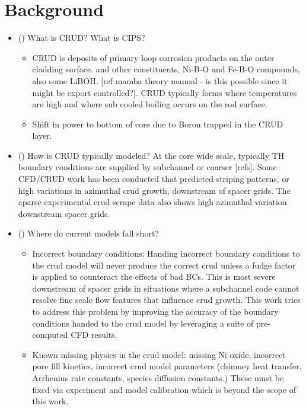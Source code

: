 
\section{Background}

\begin{itemize}
        \item (\checkmark) What is CRUD?  What is CIPS?
                \begin{itemize}
                    \item CRUD is deposits of primary loop corrosion products on the outer cladding surface.   and other constituents, Ni-B-O and Fe-B-O compounds, also some LiBOH. [ref mamba theory manual - is this possible since it might be export controlled?].  CRUD  typically forms where temperatures are high and where sub cooled boiling occurs on the rod surface.
                \item Shift in power to bottom of core due to Boron trapped in the CRUD layer.
                \end{itemize}
        \item (\checkmark) How is CRUD typically modeled?  At the core wide scale, typically TH boundary conditions are supplied by subchannel or coarser [refs].  Some CFD/CRUD work has been conducted that predicted striping patterns, or high variations in azimuthal crud growth, downstream of spacer grids.  The aparse experimental crud scrape data also shows high azimuthal variation downstream spacer grids.
        \item (\checkmark) Where do current models fall short?
        \begin{itemize}
                \item Incorrect boundary conditions: Handing incorrect boundary conditions to the crud model will never produce the correct crud unless a fudge factor is applied to counteract the effects of bad BCs.  This is most severe downstream of spacer grids in situations where a subchannel code cannot resolve fine scale flow features that influence crud growth.  This work tries to address this problem by improving the accuracy of the boundary conditions handed to the crud model by leveraging a suite of pre-computed CFD results.
                \item Known missing physics in the crud model: missing Ni oxide, incorrect pore fill kinetics, incorrect crud model parameters (chimney heat transfer, Arrhenius rate constants, species diffusion constants.) These must be fixed via experiment and model calibration which is beyond the scope of this work.
        \end{itemize}
\end{itemize}

